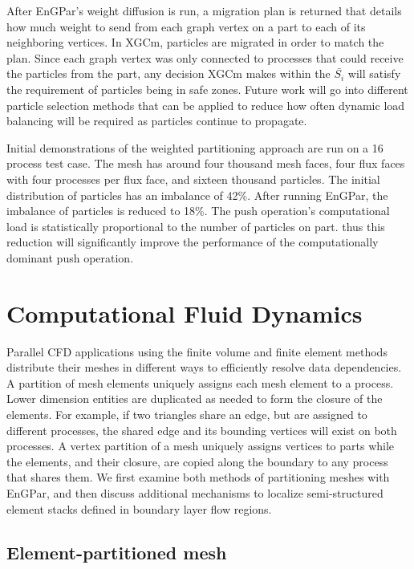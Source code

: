 \documentclass[conference]{IEEEtran}
\begin{document}
After EnGPar's weight diffusion is run, a migration plan is returned that details how
much weight to send from each graph vertex on a part to each of its neighboring vertices.
In XGCm, particles are migrated in order to match the plan. Since each graph vertex was only
connected to processes that could receive the particles from the part, any decision XGCm makes
within the $\bar{S_i}$ will satisfy the requirement of particles being in safe zones. Future work
will go into different particle selection methods that can be applied to reduce how often
dynamic load balancing will be required as particles continue to propagate.

Initial demonstrations of the weighted partitioning approach are run on a 16
process test case. The mesh has around four thousand
mesh faces, four flux faces with four processes per flux face, and sixteen thousand particles.
The initial distribution of particles has an imbalance of 42\%. After running EnGPar, the
imbalance of particles is reduced to 18\%. The push operation's computational load is
statistically proportional to the number of particles on part. thus this
reduction will significantly improve the performance of the computationally
dominant push operation.

\section{Computational Fluid Dynamics} \label{sec:cfd}

Parallel CFD applications using the
finite volume and finite element methods distribute their meshes in different
ways to efficiently resolve data dependencies.
A partition of mesh elements uniquely assigns each mesh element to a process.
Lower dimension entities are duplicated as needed to form the closure of the
elements.
For example, if two triangles share an edge, but are assigned to different
processes, the shared edge and its bounding vertices will exist on both
processes.
A vertex partition of a mesh uniquely assigns vertices to parts while the
elements, and their closure, are copied along the boundary to any process that
shares them.
We first examine both methods of partitioning meshes with EnGPar, and then
discuss additional mechanisms to localize semi-structured element stacks
defined in boundary layer flow regions.

\subsection{Element-partitioned mesh}\label{sec:elmPtn}
\end{document}
